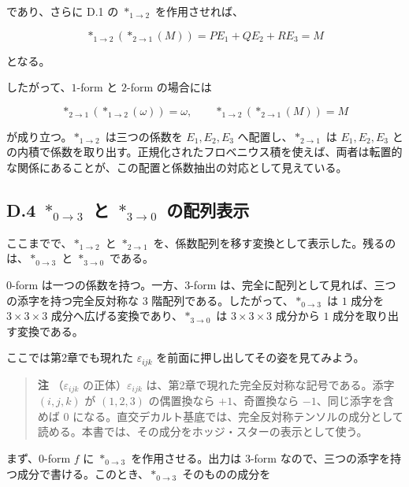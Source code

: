 \documentclass[a4paper,12pt,openany]{book}
\begin{document}
であり、さらに D.1 の \(\ast_{1\to2}\) を作用させれば、

\[
\ast_{1\to2}(\ast_{2\to1}(M))
=
P E_1+Q E_2+R E_3
=
M
\]

となる。

したがって、\(1\)-form と \(2\)-form の場合には

\[
\ast_{2\to1}(\ast_{1\to2}(\omega))=\omega,
\qquad
\ast_{1\to2}(\ast_{2\to1}(M))=M
\]

が成り立つ。\(\ast_{1\to2}\) は三つの係数を \(E_1,E_2,E_3\)
へ配置し、\(\ast_{2\to1}\) は \(E_1,E_2,E_3\)
との内積で係数を取り出す。正規化されたフロベニウス積を使えば、両者は転置的な関係にあることが、この配置と係数抽出の対応として見えている。

\hypertarget{d.4-ast_0to3-ux3068-ast_3to0-ux306eux914dux5217ux8868ux793a}{%
\subsection*{\texorpdfstring{D.4 \(\ast_{0\to3}\) と \(\ast_{3\to0}\)
の配列表示}{D.4 \textbackslash ast\_\{0\textbackslash to3\} と \textbackslash ast\_\{3\textbackslash to0\} の配列表示}}\label{d.4-ast_0to3-ux3068-ast_3to0-ux306eux914dux5217ux8868ux793a}}

ここまでで、\(\ast_{1\to2}\) と \(\ast_{2\to1}\)
を、係数配列を移す変換として表示した。残るのは、\(\ast_{0\to3}\) と
\(\ast_{3\to0}\) である。

\(0\)-form は一つの係数を持つ。一方、\(3\)-form
は、完全に配列として見れば、三つの添字を持つ完全反対称な \(3\)
階配列である。したがって、\(\ast_{0\to3}\) は \(1\) 成分を
\(3\times3\times3\) 成分へ広げる変換であり、\(\ast_{3\to0}\) は
\(3\times3\times3\) 成分から \(1\) 成分を取り出す変換である。

ここでは第2章でも現れた \(\varepsilon_{ijk}\)
を前面に押し出してその姿を見てみよう。

\begin{quote}
\textbf{注} （\(\varepsilon_{ijk}\) の正体）\(\varepsilon_{ijk}\)
は、第2章で現れた完全反対称な記号である。添字 \((i,j,k)\) が \((1,2,3)\)
の偶置換なら \(+1\)、奇置換なら \(-1\)、同じ添字を含めば \(0\)
になる。直交デカルト基底では、完全反対称テンソルの成分として読める。本書では、その成分をホッジ・スターの表示として使う。
\end{quote}

まず、\(0\)-form \(f\) に \(\ast_{0\to3}\) を作用させる。出力は
\(3\)-form
なので、三つの添字を持つ成分で書ける。このとき、\(\ast_{0\to3}\)
そのものの成分を
\end{document}
